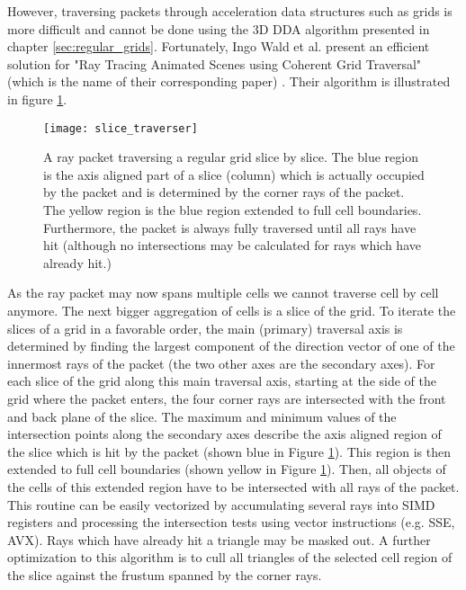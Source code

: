 However, traversing packets through acceleration data structures such as grids is more difficult and cannot be done using the 3D DDA algorithm presented in chapter \ref{sec:regular_grids}. Fortunately, Ingo Wald et al. present an efficient solution for "Ray Tracing Animated Scenes using Coherent Grid Traversal" (which is the name of their corresponding paper) \cite{packet_caster}. Their algorithm is illustrated in figure \ref{fig:slice_traverser}.

\begin{figure}
\centering
\texttt{[image: slice\_traverser]}
\caption{A ray packet traversing a regular grid slice by slice. The blue region is the axis aligned part of a slice (column) which is actually occupied by the packet and is determined by the corner rays of the packet. The yellow region is the blue region extended to full cell boundaries. Furthermore, the packet is always fully traversed until all rays have hit (although no intersections may be calculated for rays which have already hit.)}
\label{fig:slice_traverser} 
\end{figure}

As the ray packet may now spans multiple cells we cannot traverse cell by cell anymore. The next bigger aggregation of cells is a slice of the grid. To iterate the slices of a grid in a favorable order, the main (primary) traversal axis is determined by finding the largest component of the direction vector of one of the innermost rays of the packet (the two other axes are the secondary axes). For each slice of the grid along this main traversal axis, starting at the side of the grid where the packet enters, the four corner rays are intersected with the front and back plane of the slice. The maximum and minimum values of the intersection points along the secondary axes describe the axis aligned region of the slice which is hit by the packet (shown blue in Figure \ref{fig:slice_traverser}). This region is then extended to full cell boundaries (shown yellow in Figure \ref{fig:slice_traverser}). Then, all objects of the cells of this extended region have to be intersected with all rays of the packet. This routine can be easily vectorized by accumulating several rays into SIMD registers and processing the intersection tests using vector instructions (e.g. SSE, AVX). Rays which have already hit a triangle may be masked out. A further optimization to this algorithm is to cull all triangles of the selected cell region of the slice against the frustum spanned by the corner rays.


